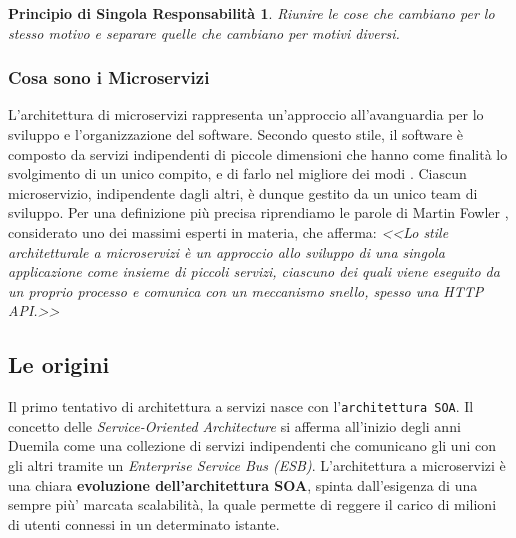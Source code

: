 \newtheorem*{defin1}{Principio di Singola Responsabilità}
\begin{defin1}
    Riunire le cose che cambiano per lo stesso motivo e separare quelle che cambiano per motivi diversi.
\end{defin1}

\subsubsection{Cosa sono i Microservizi}
L'architettura di microservizi rappresenta un'approccio all'avanguardia per lo sviluppo e l'organizzazione del software. Secondo questo stile, il software è composto da servizi indipendenti di piccole dimensioni che hanno come finalità lo svolgimento di un unico compito, e di farlo nel migliore dei modi \cite{amazon:microservices}. Ciascun microservizio, indipendente dagli altri, è dunque gestito da un unico team di sviluppo. Per una definizione più precisa riprendiamo le parole di Martin Fowler \cite{fowler:microservices}, considerato uno dei massimi esperti in materia, che afferma: \textit{<<Lo stile architetturale a microservizi è un approccio allo sviluppo di una singola applicazione come insieme di piccoli servizi, ciascuno dei quali viene eseguito da un proprio processo e comunica con un meccanismo snello, spesso una HTTP API.>>} 

\subsection{Le origini}
Il primo tentativo di architettura a servizi nasce con l’\texttt{architettura SOA}. Il concetto delle \textit{Service-Oriented Architecture} si afferma all’inizio degli anni Duemila come una collezione di servizi indipendenti che comunicano gli uni con gli altri tramite un \textit{Enterprise Service Bus (ESB)}. L’architettura a microservizi è una chiara \textbf{evoluzione dell’architettura SOA}, spinta dall’esigenza  di una sempre più’ marcata scalabilità, la quale permette di reggere il carico di milioni di utenti connessi in un determinato istante.

